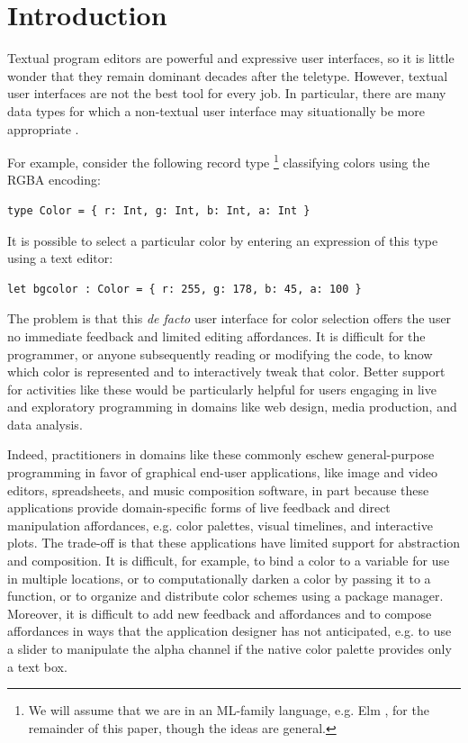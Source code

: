 \section{Introduction}\label{sec:intro}
Textual program editors are powerful and expressive user interfaces, 
so it is little wonder that they remain dominant decades after the teletype. 
However, textual user interfaces are not the best tool for every job. 
In particular, there are many 
data types for which a non-textual  
user interface may situationally be more appropriate \cite{Graphite}.

For example, consider the following record type%
\footnote{We will assume that we are in an ML-family language, 
e.g. Elm \cite{Elm,ElmArchitecture,czaplicki2012elm}, 
for the remainder of this paper, though the ideas are general.} 
classifying colors using the RGBA encoding:
\begin{lstlisting}[numbers=none]
type Color = { r: Int, g: Int, b: Int, a: Int }
\end{lstlisting}
It is possible to select a particular color by entering  
an expression of this type using a text editor:
\begin{lstlisting}[numbers=none]
let bgcolor : Color = { r: 255, g: 178, b: 45, a: 100 }
\end{lstlisting}
The problem is that this \emph{de facto} user interface for color selection 
offers the user no immediate feedback 
and limited editing affordances.
It is difficult for the programmer, or anyone subsequently reading or modifying the code, to know which color is represented 
and to interactively tweak that color. 
Better support for activities like these would be particularly helpful for users engaging in 
live and exploratory programming in domains like web design, media production, 
and data analysis.

Indeed, practitioners in domains like these commonly eschew general-purpose programming 
in favor of graphical end-user applications, like %
image and video editors, spreadsheets, and music composition software, 
in part because these applications provide domain-specific forms of live feedback and 
direct manipulation affordances, e.g. color palettes, visual timelines, and interactive plots. 
The trade-off is that these applications have limited support for abstraction and composition. 
It is difficult, for example, to bind a
color to a variable for use in multiple locations, 
or to computationally darken a color by passing it to a function, 
or to organize and distribute color schemes using a package manager.
Moreover, it is difficult to add new feedback and affordances and to compose 
affordances in ways that the application designer has not anticipated, 
e.g. to use a slider to manipulate the alpha channel 
if the native color palette provides only a text box.

